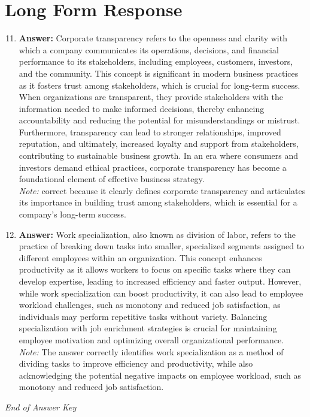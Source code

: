 \documentclass[12pt]{article}
\begin{document}
\section*{Long Form Response}
\begin{enumerate}[label=\arabic*.]
\setcounter{enumi}{10}
\item \textbf{Answer:} Corporate transparency refers to the openness and clarity with which a company communicates its operations, decisions, and financial performance to its stakeholders, including employees, customers, investors, and the community. This concept is significant in modern business practices as it fosters trust among stakeholders, which is crucial for long-term success. When organizations are transparent, they provide stakeholders with the information needed to make informed decisions, thereby enhancing accountability and reducing the potential for misunderstandings or mistrust. Furthermore, transparency can lead to stronger relationships, improved reputation, and ultimately, increased loyalty and support from stakeholders, contributing to sustainable business growth. In an era where consumers and investors demand ethical practices, corporate transparency has become a foundational element of effective business strategy.
\\ \textit{Note:} correct because it clearly defines corporate transparency and articulates its importance in building trust among stakeholders, which is essential for a company's long-term success.
\item \textbf{Answer:} Work specialization, also known as division of labor, refers to the practice of breaking down tasks into smaller, specialized segments assigned to different employees within an organization. This concept enhances productivity as it allows workers to focus on specific tasks where they can develop expertise, leading to increased efficiency and faster output. However, while work specialization can boost productivity, it can also lead to employee workload challenges, such as monotony and reduced job satisfaction, as individuals may perform repetitive tasks without variety. Balancing specialization with job enrichment strategies is crucial for maintaining employee motivation and optimizing overall organizational performance.
\\ \textit{Note:} The answer correctly identifies work specialization as a method of dividing tasks to improve efficiency and productivity, while also acknowledging the potential negative impacts on employee workload, such as monotony and reduced job satisfaction.
\end{enumerate}

\vfill
\noindent\textit{End of Answer Key}
\end{document}
